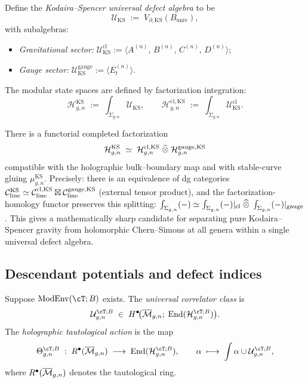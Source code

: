 \begin{definition}
\label{def:ks-universal-defect}
Define the \emph{Kodaira--Spencer universal defect algebra} to be
\[
\mathcal{U}_{\mathrm{KS}}
\;:=\;
V_{\partial,\mathrm{KS}}(B_{\mathrm{univ}}),
\]
with subalgebras:
\begin{itemize}[leftmargin=1.8em]
\item \emph{Gravitational sector:}
 $\mathcal{U}_{\mathrm{KS}}^{\mathrm{cl}}
 :=\langle A^{(n)},\,B^{(n)},\,C^{(n)},\,D^{(n)}\rangle$;
\item \emph{Gauge sector:}
 $\mathcal{U}_{\mathrm{KS}}^{\mathrm{gauge}}
 :=\langle E_t^{(n)}\rangle$.
\end{itemize}
The modular state spaces are defined by factorization integration:
\[
\mathcal{H}_{g,n}^{\mathrm{KS}}
\;:=\;
\int_{\Sigma_{g,n}}\!\mathcal{U}_{\mathrm{KS}},
\qquad
\mathcal{H}_{g,n}^{\mathrm{cl,KS}}
\;:=\;
\int_{\Sigma_{g,n}}\!\mathcal{U}_{\mathrm{KS}}^{\mathrm{cl}}.
\]
\end{definition}

\begin{conjecture}
\label{conj:ks-open-closed-splitting}
There is a functorial completed factorization
\[
\mathcal{H}_{g,n}^{\mathrm{KS}}
\;\simeq\;
\mathcal{H}_{g,n}^{\mathrm{cl,KS}}
\;\widehat{\otimes}\;
\mathcal{H}_{g,n}^{\mathrm{gauge,KS}}
\]
compatible with the holographic bulk--boundary map and with stable-curve
gluing
$\mu_{g,n}^{\mathrm{KS}}$.
Precisely: there is an equivalence of dg categories
$\mathcal C_{\mathrm{line}}^{\mathrm{KS}} \simeq
\mathcal C_{\mathrm{line}}^{\mathrm{cl,KS}} \boxtimes
\mathcal C_{\mathrm{line}}^{\mathrm{gauge,KS}}$
(external tensor product), and the factorization-homology functor preserves
this splitting:
$\int_{\Sigma_{g,n}} (-) \simeq
\int_{\Sigma_{g,n}} (-)|_{\mathrm{cl}} \;\widehat{\otimes}\;
\int_{\Sigma_{g,n}} (-)|_{\mathrm{gauge}}$.
This gives a mathematically sharp candidate for separating pure
Kodaira--Spencer gravity from holomorphic Chern--Simons at all genera
within a single universal defect algebra.
\end{conjecture}


\subsection{Descendant potentials and defect indices}
\label{subsec:descendant-potentials}

\begin{definition}
\label{def:descendant-taut-action}
Suppose $\ModEnv(\cT;B)$ exists. The \emph{universal correlator class} is
\[
\mathcal{U}_{g,n}^{\cT;B}
\;\in\;
H^{\bullet}\!\bigl(\Mbar_{g,n};\;\End(\mathcal{H}_{g,n}^{\cT;B})\bigr).
\]
The \emph{holographic tautological action} is the map
\[
\Theta_{g,n}^{\cT;B}
\;:\;
\Rring(\Mbar_{g,n})
\;\longrightarrow\;
\End(\mathcal{H}_{g,n}^{\cT;B}),
\qquad
\alpha\;\longmapsto\;
\int\alpha\cup\mathcal{U}_{g,n}^{\cT;B},
\]
where $R^{\bullet}(\overline{\mathcal M}_{g,n})$ denotes the tautological ring.
\end{definition}

